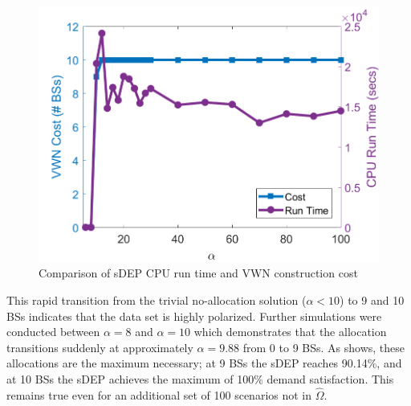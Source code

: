 \documentclass[12pt,dvipsnames]{report}
\begin{document}
\begin{figure}[htp]
	\centering
	\includegraphics[height=0.4\textheight]{Figures/CaseI_sDEPComparisonCostRuntime}
	\caption[Comparison of sDEP approach run time and costs for Case I simulations]{Comparison of sDEP CPU run time and VWN construction cost}
	\label{fig:CaseI_sDEPComparisonCostRunTime}
\end{figure}

This rapid transition from the trivial no-allocation solution ($\alpha < 10$) to 9 and 10 BSs indicates that the data set is highly polarized.  Further simulations were conducted between $\alpha = 8$ and $\alpha = 10$ which demonstrates that the allocation transitions suddenly at approximately $\alpha = 9.88$ from 0 to 9 BSs.  As  shows, these allocations are the maximum necessary; at 9 BSs the sDEP reaches 90.14\%, and at 10 BSs the sDEP achieves the maximum of 100\% demand satisfaction.  This remains true even for an additional set of 100 scenarios not in $\hat{\Omega}$.
\end{document}
